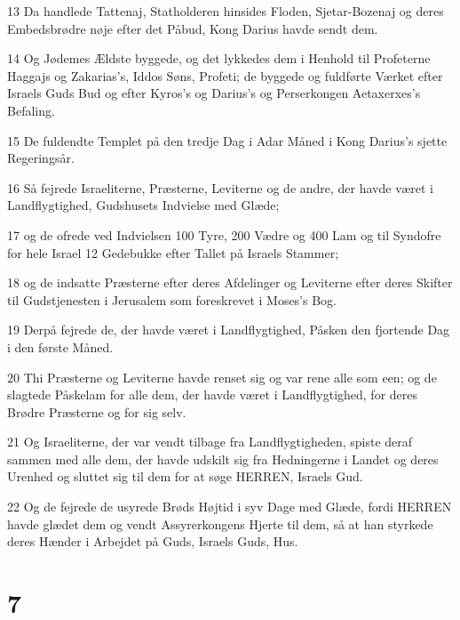 \par 13 Da handlede Tattenaj, Statholderen hinsides Floden, Sjetar-Bozenaj og deres Embedsbrødre nøje efter det Påbud, Kong Darius havde sendt dem.
\par 14 Og Jødemes Ældste byggede, og det lykkedes dem i Henhold til Profeterne Haggajs og Zakarias's, Iddos Søns, Profeti; de byggede og fuldførte Værket efter Israels Guds Bud og efter Kyros's og Darius's og Perserkongen Aetaxerxes's Befaling.
\par 15 De fuldendte Templet på den tredje Dag i Adar Måned i Kong Darius's sjette Regeringsår.
\par 16 Så fejrede Israeliterne, Præsterne, Leviterne og de andre, der havde været i Landflygtighed, Gudshusets Indvielse med Glæde;
\par 17 og de ofrede ved Indvielsen 100 Tyre, 200 Vædre og 400 Lam og til Syndofre for hele Israel 12 Gedebukke efter Tallet på Israels Stammer;
\par 18 og de indsatte Præsterne efter deres Afdelinger og Leviterne efter deres Skifter til Gudstjenesten i Jerusalem som foreskrevet i Moses's Bog.
\par 19 Derpå fejrede de, der havde været i Landflygtighed, Påsken den fjortende Dag i den første Måned.
\par 20 Thi Præsterne og Leviterne havde renset sig og var rene alle som een; og de slagtede Påskelam for alle dem, der havde været i Landflygtighed, for deres Brødre Præsterne og for sig selv.
\par 21 Og Israeliterne, der var vendt tilbage fra Landflygtigheden, spiste deraf sammen med alle dem, der havde udskilt sig fra Hedningerne i Landet og deres Urenhed og sluttet sig til dem for at søge HERREN, Israels Gud.
\par 22 Og de fejrede de usyrede Brøds Højtid i syv Dage med Glæde, fordi HERREN havde glædet dem og vendt Assyrerkongens Hjerte til dem, så at han styrkede deres Hænder i Arbejdet på Guds, Israels Guds, Hus.

\chapter{7}

